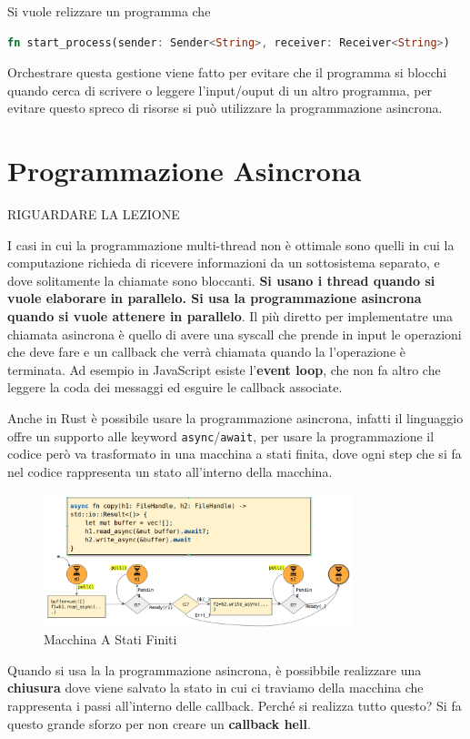 \documentclass[12pt]{article}
\begin{document}
Si vuole relizzare un programma che 
\begin{lstlisting}[language=rust]
fn start_process(sender: Sender<String>, receiver: Receiver<String>)
\end{lstlisting}
Orchestrare questa gestione viene fatto per evitare che il programma si blocchi quando cerca di scrivere o leggere l'input/ouput di un altro programma, per evitare questo spreco di risorse si pu\`o utilizzare la programmazione asincrona.


\section{Programmazione Asincrona}
RIGUARDARE LA LEZIONE

I casi in cui la programmazione multi-thread non \`e ottimale sono quelli in cui la computazione richieda di ricevere informazioni da un sottosistema separato, e dove solitamente la chiamate sono bloccanti. \textbf{Si usano i thread quando si vuole elaborare in parallelo. Si usa la programmazione asincrona quando si vuole attenere in parallelo}. Il pi\`u diretto per implementatre una chiamata asincrona \`e quello di avere una syscall che prende in input le operazioni che deve fare e un callback che verr\`a chiamata quando la l'operazione \`e terminata. Ad esempio in JavaScript esiste l'\textbf{event loop}, che non fa altro che leggere la coda dei messaggi ed esguire le callback associate.

Anche in Rust \`e possibile usare la programmazione asincrona, infatti il linguaggio offre un supporto alle keyword \texttt{async}/\texttt{await}, per usare la programmazione il codice per\`o va trasformato in una macchina a stati finita, dove ogni step che si fa nel codice rappresenta un stato all'interno della macchina.
\begin{figure}[H]
  \centering
  \includegraphics[width=0.8\textwidth]{macchina-a-stati-finiti.png}
  \caption{Macchina A Stati Finiti}
  \label{fig:macchina-a-stati-finiti}
\end{figure}
Quando si usa la la programmazione asincrona, \`e possibbile realizzare una \textbf{chiusura} dove viene salvato la stato in cui ci traviamo della macchina che rappresenta i passi all'interno delle callback. Perch\'e si realizza tutto questo? Si fa questo grande sforzo per non creare un \textbf{callback hell}.
\end{document}

